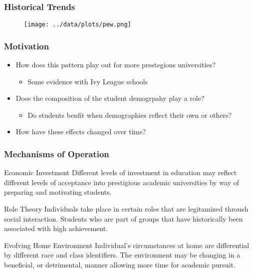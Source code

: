 \documentclass{beamer}
\begin{document}

\begin{frame}
\frametitle{Historical Trends}
\begin{figure}
\texttt{[image: ../data/plots/pew.png]}
\end{figure}
\end{frame}


\begin{frame}
\frametitle{Motivation}
\begin{itemize}
  \item How does this pattern play out for more prestegious universities?
  \begin{itemize}
    \item Some evidence with Ivy League schools
  \end{itemize}
  \item Does the composition of the student demogrpahy play a role?
  \begin{itemize}
    \item Do students benfit when demographies reflect their own or others?
  \end{itemize}
  \item How have these effects changed over time?
\end{itemize}
\end{frame}


\begin{frame}
\frametitle{Mechanisms of Operation}
\begin{block}{Economic Investment}
Different levels of investment in education may reflect different levels of
acceptance into prestigious academic universities by way of preparing and
motivating students.
\end{block}

\begin{block}{Role Theory}
Individuals take place in certain roles that are legitamized throush social
interaction. Students who are part of groups that have historically been
associated with high achievement.
\end{block}

\begin{block}{Evolving Home Environment}
Individual's circumstances at home are differential by different race and class
identifiers. The environment may be changing in a beneficial, or detrimental,
manner allowing more time for academic pursuit.
\end{block}
\end{frame}
\end{document}
